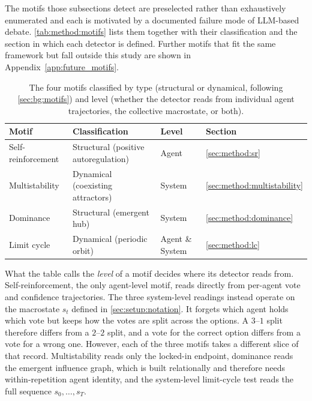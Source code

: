 The motifs those subsections detect are preselected rather than exhaustively
enumerated and each is motivated by a documented failure mode of \ac{LLM}-based debate.
\autoref{tab:method:motifs} lists them together with their classification and the
section in which each detector is defined. Further motifs that fit the same
framework but fall outside this study are shown in
Appendix~\ref{app:future_motifs}.

\begin{table}[H]
\centering
\small
\begin{tabular}{llll}
\toprule
Motif & Classification & Level & Section \\
\midrule
Self-reinforcement & Structural (positive autoregulation) & Agent & \autoref{sec:method:sr} \\
Multistability        & Dynamical (coexisting attractors)    & System & \autoref{sec:method:multistability} \\
Dominance          & Structural (emergent hub)            & System & \autoref{sec:method:dominance} \\
Limit cycle        & Dynamical (periodic orbit)           & Agent \& System & \autoref{sec:method:lc} \\
\bottomrule
\end{tabular}
\caption[Motif classification]{The four motifs classified by type (structural or dynamical, following
\autoref{sec:bg:motifs}) and level (whether the detector reads from individual
agent trajectories, the collective macrostate, or both).}
\label{tab:method:motifs}
\end{table}

What the table calls the \emph{level} of a motif decides where its detector reads
from. Self-reinforcement, the only agent-level motif, reads directly from
per-agent vote and confidence trajectories. The three system-level readings
instead operate on the macrostate $s_t$ defined in \autoref{sec:setup:notation}.
It forgets which agent holds which vote but keeps how the votes are split across
the options. A $3$--$1$ split therefore differs from a $2$--$2$ split, and a vote
for the correct option differs from a vote for a wrong one. However, each of the three motifs 
takes a different slice of that record. Multistability reads only the locked-in endpoint, dominance reads the
emergent influence graph, which is built relationally and therefore needs
within-repetition agent identity, and the system-level limit-cycle test reads the
full sequence $s_0, \ldots, s_T$.

